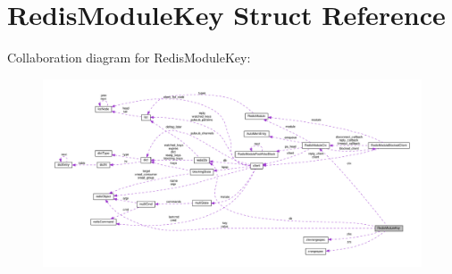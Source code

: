 \hypertarget{struct_redis_module_key}{}\section{Redis\+Module\+Key Struct Reference}
\label{struct_redis_module_key}


Collaboration diagram for Redis\+Module\+Key\+:
\nopagebreak
\begin{figure}[H]
\begin{center}
\leavevmode
\includegraphics[width=350pt]{struct_redis_module_key__coll__graph}
\end{center}
\end{figure}
